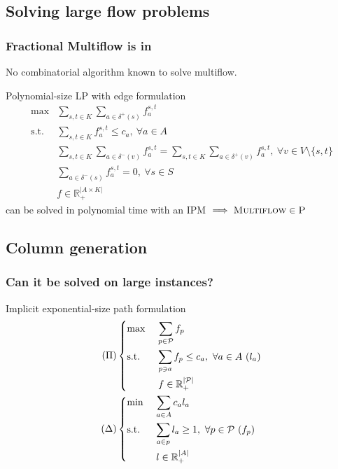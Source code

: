 \documentclass{beamer}
\begin{document}
\subsection{Solving large flow problems}
\begin{frame}
    \frametitle{Fractional Multiflow is in }
    
    No combinatorial algorithm known to solve multiflow.

    \begin{block}{Polynomial-size LP with edge formulation}
    \begin{align*}
        \max & \sum_{s,t \in K} \sum_{a \in \delta^+(s)} f_a^{s,t}\\
        \text{s.t.} & \sum_{s,t \in K} f_a^{s,t} \leq c_a, ~\forall a \in A\\
                    & \sum_{s,t\in K} \sum_{a \in \delta^-(v)} f_a^{s,t} =
                      \sum_{s,t \in K} \sum_{a \in \delta^+(v)} f_a^{s,t},
                      ~ \forall v \in V \setminus \{s,t\}\\
                    & \sum_{a \in \delta^-(s)} f_a^{s,t} = 0,
                      ~ \forall s \in S \\
                    & f\in \mathbb{R}_+^{|A \times K|}
    \end{align*}
    can be solved in polynomial time with an IPM $\implies \textsc{Multiflow}
    \in \textsc{P}$
    \end{block}

\end{frame}

\subsection{Column generation}
\begin{frame}
    \frametitle{Can it be solved on large instances?}

    \begin{block}{Implicit exponential-size path formulation}
    \begin{align*}
    (\Pi) & \begin{dcases}
    \max~ & \sum_{p\in\mathcal{P}} f_p\\
    \text{s.t.}~& \sum_{p\ni a} f_p \leq c_a,~\forall a\in A ~(l_a)\\
    & f \in \mathbb{R}_+^{|\mathcal{P}|}
    \end{dcases}
    \\
    (\Delta) & \begin{dcases}
    \min~ & \sum_{a\in A} c_a l_a\\
    \text{s.t.}~& \sum_{a\in p} l_a \geq 1,~\forall p\in \mathcal{P} ~(f_p)\\
    & l \in \mathbb{R}_+^{|A|}
    \end{dcases}
    \end{align*}
    \end{block}
\end{frame}
\end{document}
